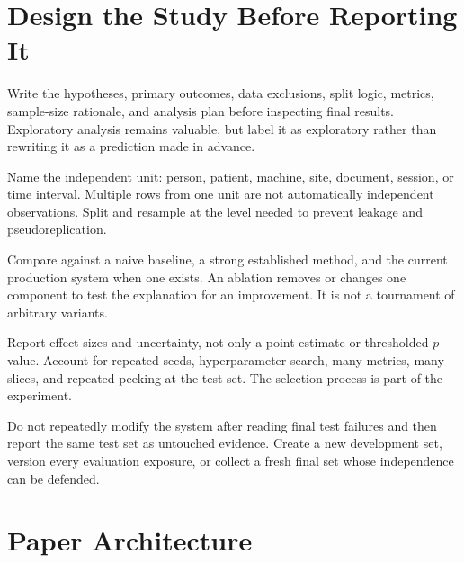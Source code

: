 \section{Design the Study Before Reporting It}

\begin{tcbitemize}[skin=sectionraster]
\tcbitem[title={Protocol and Preregistration},raster multicolumn=3]
Write the hypotheses, primary outcomes, data exclusions, split logic, metrics,
sample-size rationale, and analysis plan before inspecting final results.
Exploratory analysis remains valuable, but label it as exploratory rather than
rewriting it as a prediction made in advance.

\tcbitem[title={Unit of Analysis},raster multicolumn=3]
Name the independent unit: person, patient, machine, site, document, session,
or time interval.
Multiple rows from one unit are not automatically independent observations.
Split and resample at the level needed to prevent leakage and
pseudoreplication.

\tcbitem[title={Baselines and Ablations},raster multicolumn=3]
Compare against a naive baseline, a strong established method, and the current
production system when one exists.
An ablation removes or changes one component to test the explanation for an
improvement.
It is not a tournament of arbitrary variants.

\tcbitem[title={Uncertainty and Multiplicity},raster multicolumn=3]
Report effect sizes and uncertainty, not only a point estimate or thresholded
$p$-value.
Account for repeated seeds, hyperparameter search, many metrics, many slices,
and repeated peeking at the test set.
The selection process is part of the experiment.
\end{tcbitemize}

\begin{cautionbox}
Do not repeatedly modify the system after reading final test failures and then
report the same test set as untouched evidence.
Create a new development set, version every evaluation exposure, or collect a
fresh final set whose independence can be defended.
\end{cautionbox}

\section{Paper Architecture}

